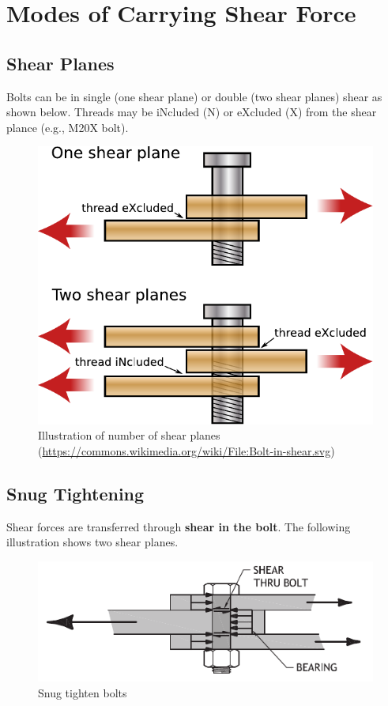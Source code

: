 \section{Modes of Carrying Shear Force}
\subsection{Shear Planes}
Bolts can be in single (one shear plane) or double (two shear planes) shear as shown below. Threads may be iNcluded (N) or eXcluded (X) from the shear plance (e.g., M20X bolt).
\begin{figure}[H]
\centering
\includegraphics{PIC/CH06/SP}
\caption{Illustration of number of shear planes (\href{https://commons.wikimedia.org/wiki/File:Bolt-in-shear.svg}{\url{https://commons.wikimedia.org/wiki/File:Bolt-in-shear.svg}})}
\end{figure}
\subsection{Snug Tightening}
Shear forces are transferred through \textbf{shear in the bolt}. The following illustration shows two shear planes.
\begin{figure}[H]
\centering
\includegraphics{PIC/CH06/STB}
\caption{Snug tighten bolts \citep{McMullin2018}}
\end{figure}
